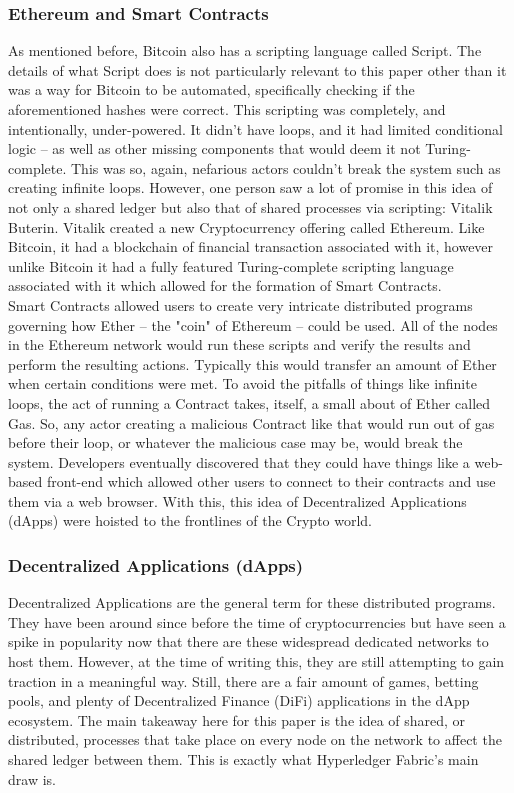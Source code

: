 		\subsubsection{Ethereum and Smart Contracts}
			\hspace{10mm}As mentioned before, Bitcoin also has a scripting language called Script. The details of what Script does is not particularly relevant to this paper other than it was a way for Bitcoin to be automated, specifically checking if the aforementioned hashes were correct. This scripting was completely, and intentionally, under-powered. It didn't have loops, and it had limited conditional logic -- as well as other missing components that would deem it not Turing-complete. This was so, again, nefarious actors couldn't break the system such as creating infinite loops. However, one person saw a lot of promise in this idea of not only a shared ledger but also that of shared processes via scripting: Vitalik Buterin. Vitalik created a new Cryptocurrency offering called Ethereum. Like Bitcoin, it had a blockchain of financial transaction associated with it, however unlike Bitcoin it had a fully featured Turing-complete scripting language associated with it which allowed for the formation of Smart Contracts.\\
			\hspace{10mm}Smart Contracts allowed users to create very intricate distributed programs governing how Ether -- the "coin" of Ethereum -- could be used. All of the nodes in the Ethereum network would run these scripts and verify the results and perform the resulting actions. Typically this would transfer an amount of Ether when certain conditions were met. To avoid the pitfalls of things like infinite loops, the act of running a Contract takes, itself, a small about of Ether called Gas. So, any actor creating a malicious Contract like that would run out of gas before their loop, or whatever the malicious case may be, would break the system. Developers eventually discovered that they could have things like a web-based front-end which allowed other users to connect to their contracts and use them via a web browser. With this, this idea of Decentralized Applications (dApps) were hoisted to the frontlines of the Crypto world. 
			
		\subsubsection{Decentralized Applications (dApps)}
			\hspace{10mm}Decentralized Applications are the general term for these distributed programs. They have been around since before the time of cryptocurrencies but have seen a spike in popularity now that there are these widespread dedicated networks to host them. However, at the time of writing this, they are still attempting to gain traction in a meaningful way. Still, there are a fair amount of games, betting pools, and plenty of Decentralized Finance (DiFi) applications in the dApp ecosystem. The main takeaway here for this paper is the idea of shared, or distributed, processes that take place on every node on the network to affect the shared ledger between them. This is exactly what Hyperledger Fabric's main draw is.
	
